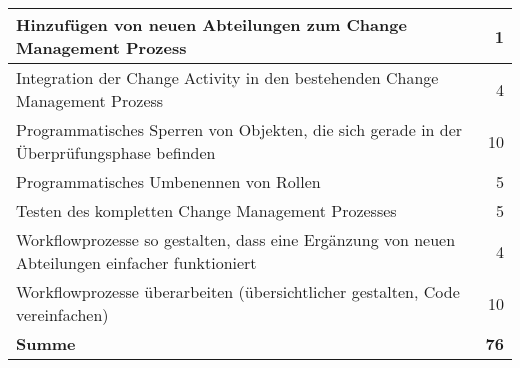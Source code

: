 \begin{table}[htbp]
\begin{tabular}{p{28.44em}r}
        \midrule
        Hinzufügen von neuen Abteilungen zum Change Management Prozess & 1 \\
        \midrule
        \rowcolor[rgb]{ .816,  .808,  .808} Integration der Change Activity in den bestehenden Change Management Prozess & 4 \\
        \midrule
        Programmatisches Sperren von Objekten, die sich gerade in der Überprüfungsphase befinden & 10 \\
        \midrule
        \rowcolor[rgb]{ .816,  .808,  .808} Programmatisches Umbenennen von Rollen & 5 \\
        \midrule
        Testen des kompletten Change Management Prozesses & 5 \\
        \midrule
        \rowcolor[rgb]{ .816,  .808,  .808} Workflowprozesse so gestalten, dass eine Ergänzung von neuen Abteilungen einfacher funktioniert & 4 \\
        \midrule
        Workflowprozesse überarbeiten (übersichtlicher gestalten, Code vereinfachen) & 10 \\
        \midrule
        \rowcolor[rgb]{ .557,  .663,  .859} \textbf{Summe} & \textbf{76} \\
        \bottomrule
    \end{tabular}%
    \label{tab:addlabel}%
\end{table}%
